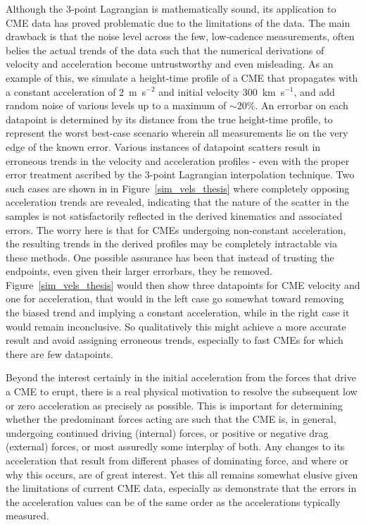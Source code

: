 \documentclass[preprint2]{aastex}
\begin{document}
Although the 3-point Lagrangian is mathematically sound, its application to CME data has proved problematic due to the limitations of the data. The main drawback is that the noise level across the few, low-cadence measurements, often belies the actual trends of the data such that the numerical derivations of velocity and acceleration become untrustworthy and even misleading. As an example of this, we simulate a height-time profile of a CME that propagates with a constant acceleration of 2~m~s$^{-2}$ and initial velocity 300~km~s$^{-1}$, and add random noise of various levels up to a maximum of $\sim$20\%. An errorbar on each datapoint is determined by its distance from the true height-time profile, to represent the worst best-case scenario wherein all measurements lie on the very edge of the known error. Various instances of datapoint scatters result in erroneous trends in the velocity and acceleration profiles - even with the proper error treatment ascribed by the 3-point Lagrangian interpolation technique. Two such cases are shown in in Figure~\ref{sim_vels_thesis} where completely opposing acceleration trends are revealed, indicating that the nature of the scatter in the samples is not satisfactorily reflected in the derived kinematics and associated errors. The worry here is that for CMEs undergoing non-constant acceleration, the resulting trends in the derived profiles may be completely intractable via these methods. One possible assurance has been that instead of trusting the endpoints, even given their larger errorbars, they be removed. Figure~\ref{sim_vels_thesis} would then show three datapoints for CME velocity and one for acceleration, that would in the left case go somewhat toward removing the biased trend and implying a constant acceleration, while in the right case it would remain inconclusive. So qualitatively this might achieve a more accurate result and avoid assigning erroneous trends, especially to fast CMEs for which there are few datapoints.

Beyond the interest certainly in the initial acceleration from the forces that drive a CME to erupt, there is a real physical motivation to resolve the subsequent low or zero acceleration as precisely as possible. This is important for determining whether the predominant forces acting are such that the CME is, in general, undergoing continued driving (internal) forces, or positive or negative drag (external) forces, or most assuredly some interplay of both. Any changes to its acceleration that result from different phases of dominating force, and where or why this occurs, are of great interest. Yet this all remains somewhat elusive given the limitations of current CME data, especially as \citet{2007ApJ...657.1117W} demonstrate that the errors in the acceleration values can be of the same order as the accelerations typically measured. 
\end{document}
